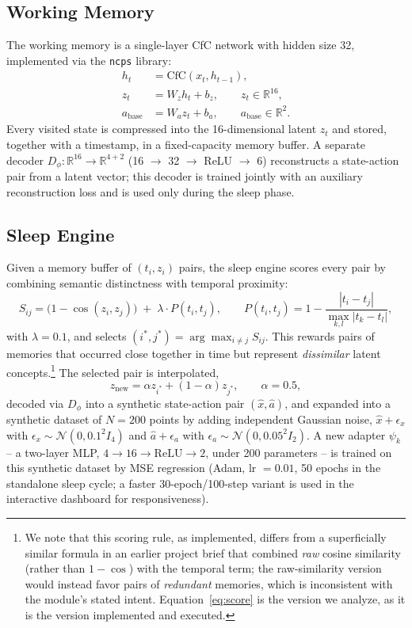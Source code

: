 \documentclass[11pt]{article}
\begin{document}
\subsection{Working Memory}
The working memory is a single-layer CfC network \cite{hasani2022} with hidden size 32, implemented via the \texttt{ncps} library:
\begin{align}
h_t &= \mathrm{CfC}(x_t, h_{t-1}), \\
z_t &= W_z h_t + b_z, \qquad z_t \in \mathbb{R}^{16}, \\
a_{\text{base}} &= W_a z_t + b_a, \qquad a_{\text{base}} \in \mathbb{R}^2.
\end{align}
Every visited state is compressed into the 16-dimensional latent $z_t$ and stored, together with a timestamp, in a fixed-capacity memory buffer. A separate decoder $D_\phi: \mathbb{R}^{16} \to \mathbb{R}^{4+2}$ (16 $\to$ 32 $\to$ ReLU $\to$ 6) reconstructs a state-action pair from a latent vector; this decoder is trained jointly with an auxiliary reconstruction loss and is used only during the sleep phase.

\subsection{Sleep Engine}
Given a memory buffer of $(t_i, z_i)$ pairs, the sleep engine scores every pair by combining semantic distinctness with temporal proximity:
\begin{equation}
S_{ij} = \big(1 - \cos(z_i, z_j)\big) \;+\; \lambda \cdot P(t_i, t_j), \qquad
P(t_i,t_j) = 1 - \frac{|t_i - t_j|}{\max_{k,l}|t_k - t_l|},
\label{eq:score}
\end{equation}
with $\lambda = 0.1$, and selects $(i^\ast, j^\ast) = \arg\max_{i \neq j} S_{ij}$. This rewards pairs of memories that occurred close together in time but represent \emph{dissimilar} latent concepts.\footnote{We note that this scoring rule, as implemented, differs from a superficially similar formula in an earlier project brief that combined \emph{raw} cosine similarity (rather than $1-\cos$) with the temporal term; the raw-similarity version would instead favor pairs of \emph{redundant} memories, which is inconsistent with the module's stated intent. Equation~\ref{eq:score} is the version we analyze, as it is the version implemented and executed.} The selected pair is interpolated,
\begin{equation}
z_{\text{new}} = \alpha z_{i^\ast} + (1-\alpha) z_{j^\ast}, \qquad \alpha = 0.5,
\end{equation}
decoded via $D_\phi$ into a synthetic state-action pair $(\hat{x}, \hat{a})$, and expanded into a synthetic dataset of $N{=}200$ points by adding independent Gaussian noise, $\hat{x} + \epsilon_x$ with $\epsilon_x \sim \mathcal{N}(0, 0.1^2 I_4)$ and $\hat{a} + \epsilon_a$ with $\epsilon_a \sim \mathcal{N}(0, 0.05^2 I_2)$. A new adapter $\psi_k$ -- a two-layer MLP, $4 \to 16 \to \mathrm{ReLU} \to 2$, under 200 parameters -- is trained on this synthetic dataset by MSE regression (Adam, lr $=0.01$, 50 epochs in the standalone sleep cycle; a faster 30-epoch/100-step variant is used in the interactive dashboard for responsiveness).
\end{document}
